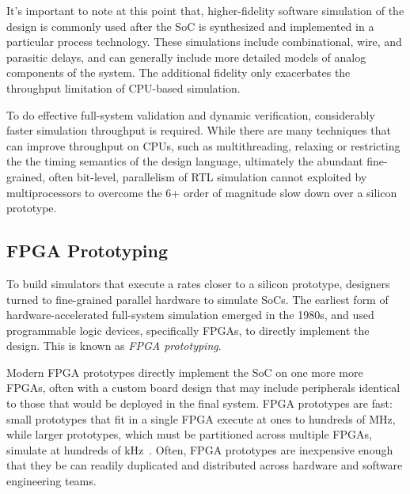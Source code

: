 It's important to note at this point that, higher-fidelity software simulation
of the design is commonly used after the SoC is synthesized and implemented in
a particular process technology.  These simulations include combinational,
wire, and parasitic delays, and can generally include more detailed models of
analog components of the system. The additional fidelity only exacerbates the
throughput limitation of CPU-based simulation.

To do effective full-system validation and dynamic verification, considerably
faster simulation throughput is required. While there are many techniques that
can improve throughput on CPUs, such as multithreading, relaxing or restricting
the the timing semantics of the design language, ultimately the abundant
fine-grained, often bit-level, parallelism of RTL simulation cannot exploited
by multiprocessors to overcome the 6+ order of magnitude slow down over a
silicon prototype.

\subsection{FPGA Prototyping}\label{sec:fpga-prototyping}

To build simulators that execute a rates closer to a silicon prototype, designers turned
to fine-grained parallel hardware to simulate SoCs.  The earliest form of
hardware-accelerated full-system simulation emerged in the 1980s, and used
programmable logic devices, specifically FPGAs, to directly implement the
design. This is known as \emph{FPGA prototyping}.

Modern FPGA prototypes directly implement the SoC on one more
more FPGAs, often with a custom board design that may include peripherals
identical to those that would be deployed in the final system.  FPGA prototypes
are fast: small prototypes that fit in a single FPGA execute at ones to hundreds of
MHz, while larger prototypes, which must be partitioned across multiple FPGAs,
simulate at hundreds of kHz~\cite{nehalemprototype, atomprototype}.
Often, FPGA prototypes are inexpensive enough that they be can readily
duplicated and distributed across hardware and software engineering teams.

